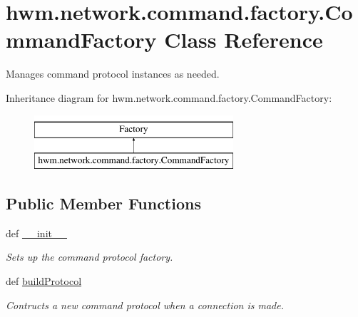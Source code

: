 \hypertarget{classhwm_1_1network_1_1command_1_1factory_1_1_command_factory}{\section{hwm.\-network.\-command.\-factory.\-Command\-Factory Class Reference}
\label{classhwm_1_1network_1_1command_1_1factory_1_1_command_factory}
}


Manages command protocol instances as needed.  


Inheritance diagram for hwm.\-network.\-command.\-factory.\-Command\-Factory\-:\begin{figure}[H]
\begin{center}
\leavevmode
\includegraphics[height=2.000000cm]{classhwm_1_1network_1_1command_1_1factory_1_1_command_factory}
\end{center}
\end{figure}
\subsection*{Public Member Functions}
\begin{DoxyCompactItemize}
\item 
\hypertarget{classhwm_1_1network_1_1command_1_1factory_1_1_command_factory_ab61b598fef0431cc0c5b0c5753e12e82}{def \hyperlink{classhwm_1_1network_1_1command_1_1factory_1_1_command_factory_ab61b598fef0431cc0c5b0c5753e12e82}{\-\_\-\-\_\-init\-\_\-\-\_\-}}\label{classhwm_1_1network_1_1command_1_1factory_1_1_command_factory_ab61b598fef0431cc0c5b0c5753e12e82}

\begin{DoxyCompactList}\small\item\em Sets up the command protocol factory. \end{DoxyCompactList}\item 
def \hyperlink{classhwm_1_1network_1_1command_1_1factory_1_1_command_factory_a16fe7ccd8e21d6fdcc57a34c82f9b2ef}{build\-Protocol}
\begin{DoxyCompactList}\small\item\em Contructs a new command protocol when a connection is made. \end{DoxyCompactList}\end{DoxyCompactItemize}



